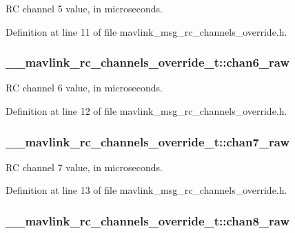 R\-C channel 5 value, in microseconds. 



Definition at line 11 of file mavlink\-\_\-msg\-\_\-rc\-\_\-channels\-\_\-override.\-h.

\hypertarget{struct____mavlink__rc__channels__override__t_a8bef6b7819abe782e905da536c34b11d}{
\subsubsection[{chan6\-\_\-raw}]{ \-\_\-\-\_\-mavlink\-\_\-rc\-\_\-channels\-\_\-override\-\_\-t\-::chan6\-\_\-raw}}\label{struct____mavlink__rc__channels__override__t_a8bef6b7819abe782e905da536c34b11d}


R\-C channel 6 value, in microseconds. 



Definition at line 12 of file mavlink\-\_\-msg\-\_\-rc\-\_\-channels\-\_\-override.\-h.

\hypertarget{struct____mavlink__rc__channels__override__t_a0380add4a72cd924a6ac61d1504dad82}{
\subsubsection[{chan7\-\_\-raw}]{ \-\_\-\-\_\-mavlink\-\_\-rc\-\_\-channels\-\_\-override\-\_\-t\-::chan7\-\_\-raw}}\label{struct____mavlink__rc__channels__override__t_a0380add4a72cd924a6ac61d1504dad82}


R\-C channel 7 value, in microseconds. 



Definition at line 13 of file mavlink\-\_\-msg\-\_\-rc\-\_\-channels\-\_\-override.\-h.

\hypertarget{struct____mavlink__rc__channels__override__t_a8028c42950c16d10f196f35df6d32404}{
\subsubsection[{chan8\-\_\-raw}]{ \-\_\-\-\_\-mavlink\-\_\-rc\-\_\-channels\-\_\-override\-\_\-t\-::chan8\-\_\-raw}}\label{struct____mavlink__rc__channels__override__t_a8028c42950c16d10f196f35df6d32404}


